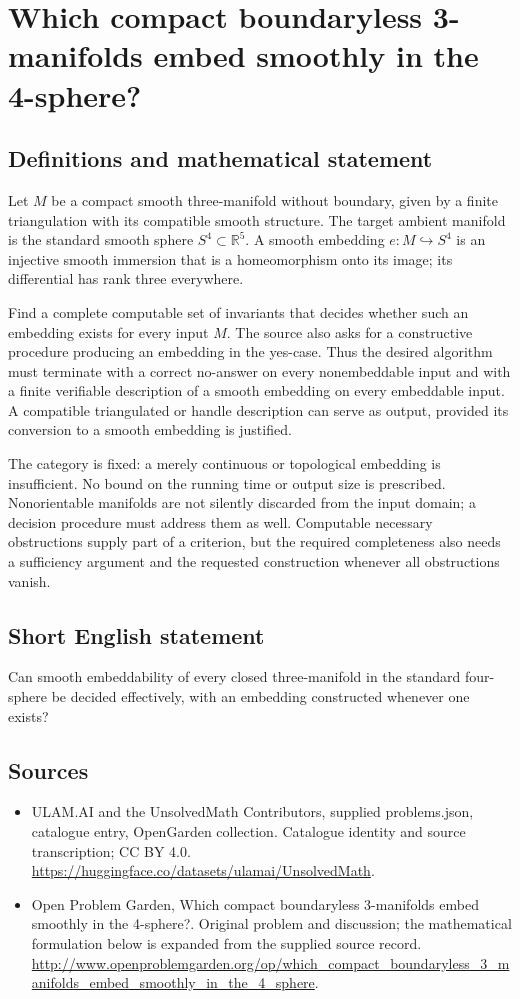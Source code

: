 \documentclass[11pt,a4paper]{article}
\begin{document}
\section*{Which compact boundaryless 3-manifolds embed smoothly in the 4-sphere?}\label{statement}

\subsection{Definitions and mathematical statement}
Let $M$ be a compact smooth three-manifold without boundary, given
by a finite triangulation with its compatible smooth structure.
The target ambient manifold is the standard smooth sphere
$S^4\subset\mathbb R^5$. A smooth embedding $e:M\hookrightarrow S^4$
is an injective smooth immersion that is a homeomorphism onto its
image; its differential has rank three everywhere.

Find a complete computable set of invariants that decides whether
such an embedding exists for every input $M$. The source also asks
for a constructive procedure producing an embedding in the yes-case.
Thus the desired algorithm must terminate with a correct no-answer
on every nonembeddable input and with a finite verifiable description
of a smooth embedding on every embeddable input. A compatible
triangulated or handle description can serve as output, provided
its conversion to a smooth embedding is justified.

The category is fixed: a merely continuous or topological embedding
is insufficient. No bound on the running time or output size is
prescribed. Nonorientable manifolds are not silently discarded from
the input domain; a decision procedure must address them as well.
Computable necessary obstructions supply part of a criterion, but
the required completeness also needs a sufficiency argument and
the requested construction whenever all obstructions vanish.
\subsection{Short English statement}
Can smooth embeddability of every closed three-manifold in the standard four-sphere be decided effectively, with an embedding constructed whenever one exists?
\subsection{Sources}
\begin{itemize}
\item[S1] ULAM.AI and the UnsolvedMath Contributors, supplied problems.json, catalogue entry, OpenGarden collection. Catalogue identity and source transcription; CC BY 4.0.
\url{https://huggingface.co/datasets/ulamai/UnsolvedMath}.
\item[S2] Open Problem Garden, Which compact boundaryless 3-manifolds embed smoothly in the 4-sphere?. Original problem and discussion; the mathematical formulation below is expanded from the supplied source record.
\url{http://www.openproblemgarden.org/op/which_compact_boundaryless_3_manifolds_embed_smoothly_in_the_4_sphere}.
\end{itemize}
\end{document}
